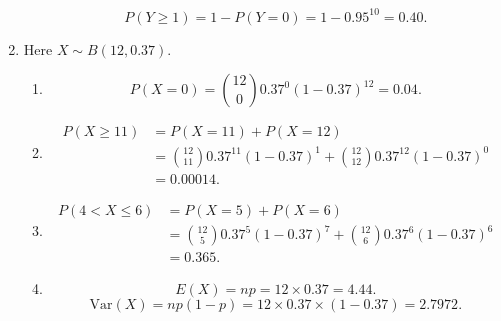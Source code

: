 \documentclass{article}
\begin{document}
\begin{enumerate}
\begin{enumerate}
    $$P(Y\geq1)=1-P(Y=0)=1-0.95^{10}=0.40.$$
    \end{enumerate}
    \item Here $X\sim B(12, 0.37)$.
    \begin{enumerate}
        \item $$P(X=0)=\binom{12}{0}0.37^0(1-0.37)^{12}=0.04.$$
        \item \begin{align*}
        P(X\geq11)&=P(X=11)+P(X=12)\\&=\binom{12}{11}0.37^{11}(1-0.37)^1+\binom{12}{12}0.37^{12}(1-0.37)^0\\&=0.00014.
      	\end{align*}
      	\item \begin{align*}
        P(4<X\leq6)&=P(X=5)+P(X=6)\\&=\binom{12}{5}0.37^5(1-0.37)^7+\binom{12}{6}0.37^6(1-0.37)^6\\&=0.365.
      	\end{align*}
      	\item $$E(X)=np=12\times0.37=4.44.$$
    $$\mathrm{Var}(X)=np(1-p)=12\times0.37\times(1-0.37)=2.7972.$$
    \end{enumerate}
\end{enumerate}
\end{document}
